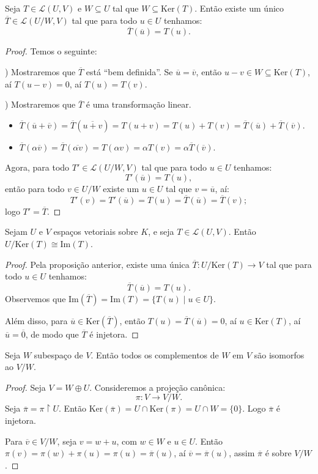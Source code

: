 \documentclass[11pt,twoside,a4paper]{book}
\begin{document}
\begin{proposicao}
Seja $T\in\mathcal{L}(U,V)$ e $W\subseteq U$ tal que $W\subseteq\mathrm{Ker}(T)$. Então existe um único $\overline{T}\in\mathcal{L}(U/W,V)$ tal que para todo $u\in U$ tenhamos:
\[
\overline{T}(\overline{u})=T(u).
\]
\end{proposicao}
\begin{proof}
Temos o seguinte:

\medskip
{}) Mostraremos que $\overline{T}$ está ``bem definida''. Se $\overline{u}=\overline{v}$, então $u-v\in W\subseteq\mathrm{Ker}(T)$, aí $T(u-v)=0$, aí $T(u)=T(v)$.

\medskip
{}) Mostraremos que $\overline{T}$ é uma transformação linear.

\begin{itemize}
\item $\overline{T}(\overline{u}+\overline{v})=\overline{T}(\overline{u+v})=T(u+v)=T(u)+T(v)=\overline{T}(\overline{u})+\overline{T}(\overline{v})$.
\item $\overline{T}(\alpha\overline{v})=\overline{T}(\overline{\alpha v})=T(\alpha v)=\alpha T(v)=\alpha\overline{T}(\overline{v})$.
\end{itemize}
Agora, para todo $T'\in\mathcal{L}(U/W,V)$ tal que para todo $u\in U$ tenhamos:
\[
T'(\overline{u})=T(u),
\]
então para todo $v\in U/W$ existe um $u\in U$ tal que $v=\overline{u}$, aí:
\[
T'(v)=T'(\overline{u})=T(u)=\overline{T}(\overline{u})=\overline{T}(v);
\]
logo $T'=\overline{T}$.
\end{proof}

\begin{teorema}
Sejam $U$ e $V$ espaços vetoriais sobre $K$, e seja $T\in\mathcal{L}(U,V)$. Então $U/\mathrm{Ker}(T)\cong\mathrm{Im}(T)$.
\end{teorema}
\begin{proof}
Pela proposição anterior, existe uma única $\overline{T}:U/\mathrm{Ker}(T)\rightarrow V$ tal que para todo $u\in U$ tenhamos:
\[
\overline{T}(\overline{u})=T(u).
\]
Observemos que $\mathrm{Im}(\overline{T})=\mathrm{Im}(T)=\{T(u)\mid u\in U\}$.

\medskip
\noindent
Além disso, para $\overline{u}\in\mathrm{Ker}(\overline{T})$, então $T(u)=\overline{T}(\overline{u})=0$, aí $u\in\mathrm{Ker}(T)$, aí $\overline{u}=\overline{0}$, de modo que $\overline{T}$ é injetora.
\end{proof}

\begin{teorema}
Seja $W$ subespaço de $V$. Então todos os complementos de $W$ em $V$ são isomorfos ao $V/W$.
\end{teorema}
\begin{proof}
Seja $V=W\oplus U$. Consideremos a projeção canônica:
\[
\pi:V\rightarrow V/W.
\]
Seja $\overline{\pi}=\pi\upharpoonright U$. Então $\mathrm{Ker}(\overline{\pi})=U\cap\mathrm{Ker}(\pi)=U\cap W=\{0\}$. Logo $\overline{\pi}$ é injetora.

\medskip
\noindent
Para $\overline{v}\in V/W$, seja $v=w+u$, com $w\in W$ e $u\in U$. Então $\pi(v)=\pi(w)+\pi(u)=\pi(u)=\overline{\pi}(u)$, aí $\overline{v}=\overline{\pi}(u)$, assim $\overline{\pi}$ é sobre $V/W$.
\end{proof}
\end{document}

